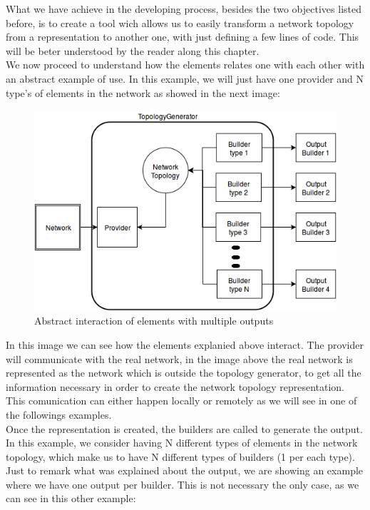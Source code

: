 What we have achieve in the developing process, besides the two objectives listed before, is to create a tool wich allows us to easily transform a network topology from a representation to another one, with just defining a few lines of code. This will be beter understood by the reader along this chapter.\\

We now proceed to understand how the elements relates one with each other with an abstract example of use. In this example, we will just have one provider and N type's of elements in the network as showed in the next image:

\begin{figure}[H]
\centering
\includegraphics[width=\textwidth]{images/topologygenerator/topologygenerator_abstract_multiple.png}
\caption{Abstract interaction of elements with multiple outputs}
\end{figure}

In this image we can see how the elements explanied above interact. The provider will communicate with the real network, in the image above the real network is represented as the network which is outside the topology generator, to get all the information necessary in order to create the network topology representation. This comunication can either happen locally or remotely as we will see in one of the followings examples.\\
Once the representation is created, the builders are called to generate the output. In this example, we consider having N different types of elements in the network topology, which make us to have N different types of builders (1 per each type). Just to remark what was explained about the output, we are showing an example where we have one output per builder. This is not necessary the only case, as we can see in this other example: 

